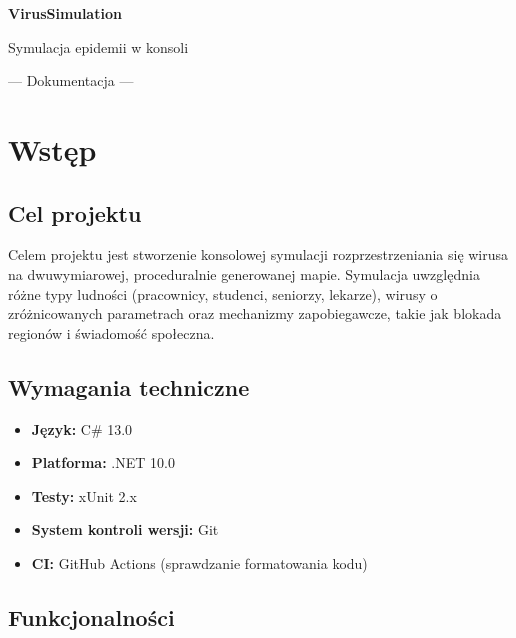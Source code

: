 \documentclass[a4paper,12pt]{article}
\begin{document}
\begin{titlepage}
    \centering
    \vspace*{4cm}
    {\Huge\bfseries VirusSimulation\par}
    \vspace{0.5cm}
    {\Large Symulacja epidemii w konsoli\par}
    \vspace{0.5cm}
    {\large --- Dokumentacja ---\par}
    \vfill
\end{titlepage}

\tableofcontents
\newpage

\section{Wstęp}

\subsection{Cel projektu}

Celem projektu jest stworzenie konsolowej symulacji rozprzestrzeniania się wirusa na dwuwymiarowej,
proceduralnie generowanej mapie. Symulacja uwzględnia różne typy ludności (pracownicy, studenci,
seniorzy, lekarze), wirusy o zróżnicowanych parametrach oraz mechanizmy zapobiegawcze, takie jak
blokada regionów i świadomość społeczna.

\subsection{Wymagania techniczne}

\begin{itemize}
    \item \textbf{Język:} C\# 13.0
    \item \textbf{Platforma:} .NET 10.0
    \item \textbf{Testy:} xUnit 2.x
    \item \textbf{System kontroli wersji:} Git
    \item \textbf{CI:} GitHub Actions (sprawdzanie formatowania kodu)
\end{itemize}

\subsection{Funkcjonalności}
\end{document}
